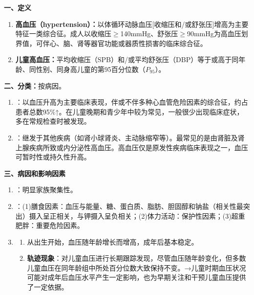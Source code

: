 \begin{keybox}
\textbf{一、定义}
\begin{enumerate}[leftmargin=*]
    \item \textbf{高血压（hypertension）：}以体循环动脉血压[收缩压和/或舒张压]增高为主要特征一类综合征。成人以收缩压$\geq$140mmHg、舒张压$\geq$90mmHg为高血压划界值，可伴心、脑、肾等器官功能或器质性损害的临床综合征。
    \item \textbf{儿童高血压：}平均收缩压（SPB）和/或平均舒张压（DBP）等于或高于同年龄、同性别、同身高儿童的第95百分位数（$P_{95}$）。
\end{enumerate}

\textbf{二、分类：}按病因。
\begin{enumerate}[leftmargin=*]
    \item {}：以血压升高为主要临床表现，伴或不伴多种心血管危险因素的综合征，约占患者总数95\%↑。在儿童晚期和青少年中较为常见，一般很少出现临床症状，多在常规检查时被发现。
    \item {}：继发于其他疾病（如肾小球肾炎、主动脉缩窄等）。最常见的是由肾脏及肾上腺疾病所致或内分泌性高血压。高血压仅是原发性疾病临床表现之一，血压可暂时性或持久性升高。
\end{enumerate}

\textbf{三、病因和影响因素}
\begin{enumerate}[leftmargin=*]
    \item {}：明显家族聚集性。
    \item {}：(1)膳食因素：血压与能量、糖、蛋白质、脂肪、胆固醇和钠盐（相关性最突出）摄入呈正相关，与钾摄入呈负相关；(2)体力活动：保护性因素；(3)超重肥胖：重要危险因素。
    \item {}
    \begin{enumerate}
        \item 从出生开始，血压随年龄增长而增高，成年后基本稳定。
        \item \textbf{轨迹现象}：对儿童血压进行长期跟踪发现，尽管血压随年龄变化，但多数儿童血压在同年龄组中所处百分位数大致保持不变。→儿童时期血压状况可能对成年后血压水平产生一定影响，也为早期关注和干预儿童血压提供了一定依据。
    \end{enumerate}
\end{enumerate}


\end{keybox}
